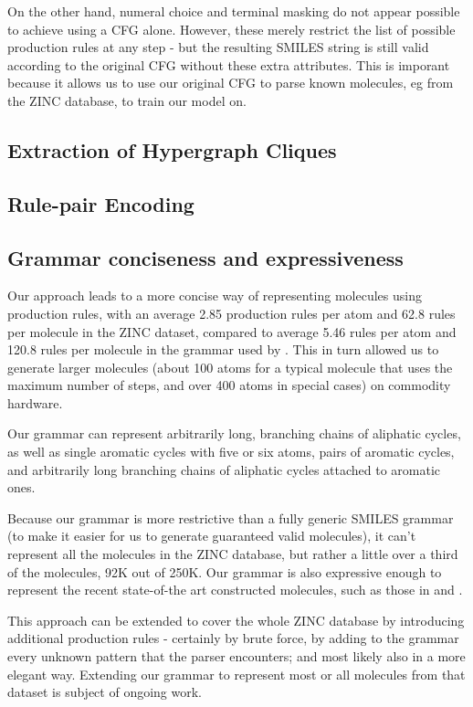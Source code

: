 \documentclass{article}
\begin{document}
On the other hand, numeral choice and terminal masking do not appear possible to achieve using a CFG alone. However, these merely restrict the list of possible production rules at any step - but the resulting SMILES string is still valid according to the original CFG without these extra attributes. This is imporant because it allows us to use our original CFG to parse known molecules, eg from the ZINC database, to train our model on.


\subsection{Extraction of Hypergraph Cliques}\label{sec:cliques}


\subsection{Rule-pair Encoding}\label{sec:rpe}


\subsection{Grammar conciseness and expressiveness}\label{sec:expressiveness}
Our approach leads to a more concise way of representing molecules using production rules, with an average 2.85 production rules per atom and 62.8 rules per molecule in the ZINC dataset, compared to average 5.46 rules per atom and 120.8 rules per molecule in the grammar used by \cite{kusner17}. This in turn allowed us to generate larger molecules (about 100 atoms for a typical molecule that uses the maximum number of steps, and over 400 atoms in special cases) on commodity hardware.

Our grammar can represent arbitrarily long, branching chains of aliphatic cycles, as well as single aromatic cycles with five or six atoms, pairs of aromatic cycles, and arbitrarily long branching chains of aliphatic cycles attached to aromatic ones.

Because our grammar is more restrictive than a fully generic SMILES grammar (to make it easier for us to generate guaranteed valid molecules), it can't represent all the molecules in the ZINC database, but rather a little over a third of the molecules, 92K out of 250K. Our grammar is also  expressive enough to represent the recent state-of-the art constructed molecules, such as those in \cite{kusner17} and \cite{jin18}. 

This approach can be extended to cover the whole ZINC database by introducing additional production rules - certainly by brute force, by adding to the grammar every unknown pattern that the parser encounters; and most likely also in a more elegant way. Extending our grammar to represent most or all molecules from that dataset is subject of ongoing work.
\end{document}
